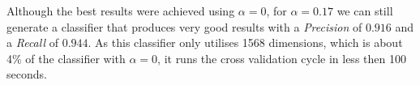 Although the best results were achieved using $\alpha=0$, for $\alpha=0.17$ we can still generate a classifier that produces very good results with a \emph{Precision} of $0.916$ and a \emph{Recall} of $0.944$.
As this classifier only utilises 1568 dimensions, which is about 4\% of the classifier with $\alpha=0$, it runs the cross validation cycle in less then 100 seconds.



% 
